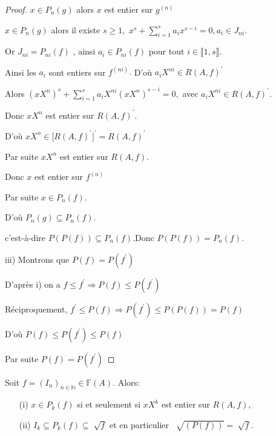\begin{proof}
	$x\in P_{n}(g)$ alors $x$ est entier sur $g^{(n)}$
	
	$x\in P_{n}(g)$ alors il existe $s\geq 1,$ $x^{s}+\sum\limits_{i=1}^{s}a_{i}x^{s-i}=0,a_{i}\in J_{ni}$.
	
	Or $J_{ni}=P_{ni}(f)$ , ainsi $a_{i}\in P_{ni}(f)$ pour tout $i\in \llbracket 1, s \rrbracket.$
	
	Ainsi les $a_{i}$ sont entiers sur $f^{(ni)}.$ D'où $a_{i}X^{ni}\in R(A,f)^{\prime }$
	
	Alors $(xX^{n})^{s}+\sum\limits_{i=1}^{s}a_{i}X^{ni}(xX^{n})^{s-i}=0,$ avec 
	$a_{i}X^{ni}\in R(A,f)^{\prime }$.
	
	Donc $xX^{n}$ est entier sur $R(A,f)^{\prime }$.
	
	D'où $xX^{n}\in \lbrack R(A,f)^{\prime }]^{\prime }=R(A,f)^{\prime }$
	
	Par suite $xX^{n}$ est entier sur $R(A,f)$.
	
	Donc $x$ est entier sur $f^{(n)}$
	
	Par suite $x\in P_{n}(f).$
	
	D'où $P_{n}(g)\subseteq P_{n}(f).$
	
	c'est-\`{a}-dire $P(P(f))\subseteq P_{n}(f).$Donc $P(P(f))=P_{n}(f).$
	
	
	
	iii) Montrons que $P(f)=P(f^{\prime })$
	
	D'après i) on a $f\leq f^{\prime }\Rightarrow P(f)\leq P(f^{\prime })$
	
	Réciproquement, $f^{\prime }\leq P(f)\Rightarrow P(f^{\prime })\leq
	P(P(f))=P(f)$
	
	D'où $P(f)\leq P(f^{\prime })\leq P(f)$
	
	Par suite $P(f)=P(f^{\prime })$
\end{proof}
\begin{maproposition}
	Soit $f=(I_n)_{n \in \mathbb{N}} \in \mathbb{F}(A)$. Alors:\\
	\begin{enumerate}
		\item[(i)] $x \in P_k(f)$ si et seulement si $xX^k$ est entier sur $R(A,f)$,
		\item[(ii)] $ I_k \subseteq P_k(f) \subseteq \sqrt[]{f}$ et en particulier $\ \sqrt[]{(P(f))} = \sqrt[]{f}$.
	\end{enumerate}
\end{maproposition}
